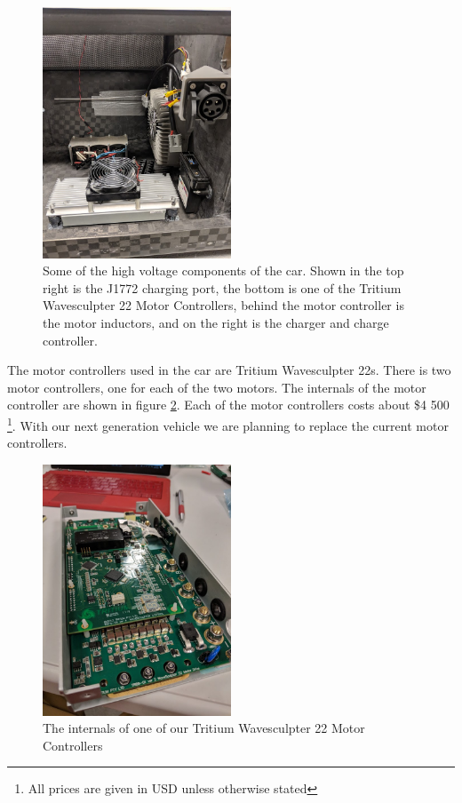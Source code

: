 \documentclass[titlepage]{article}
\begin{document}
    \begin{figure}[H]
        \centering
        \includegraphics[width=0.5\textwidth]{images/car_internals.jpg}
        \caption{Some of the high voltage components of the car. Shown
            in the top right is the J1772 charging port, the bottom is
            one of the Tritium Wavesculpter 22 Motor Controllers, behind
            the motor controller is the motor inductors, and on the
        right is the charger and charge controller.}
        \label{fig:charge}
    \end{figure}
    The motor controllers used in the car are Tritium Wavesculpter 22s.
    There is two motor controllers, one for each of the two motors. The
    internals of the motor controller are shown in figure
    \ref{fig:mc}. Each of the motor controllers costs about \$4 500
    \footnote{All prices are given in USD unless otherwise stated}.
    With our next generation vehicle we are planning to replace the
    current motor controllers.
    \begin{figure}[H]
        \centering
        \includegraphics[width=0.5\textwidth]{images/mc_inside.jpg}
        \caption{The internals of one of our Tritium Wavesculpter 22
            Motor Controllers}
        \label{fig:mc}
    \end{figure}
\end{document}
